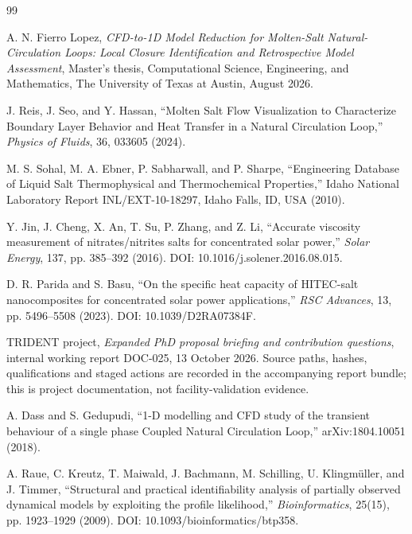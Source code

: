\begin{thebibliography}{99}

A. N. Fierro Lopez, \emph{CFD-to-1D Model Reduction for Molten-Salt Natural-Circulation Loops: Local Closure Identification and Retrospective Model Assessment},
Master's thesis, Computational Science, Engineering, and Mathematics,
The University of Texas at Austin, August 2026.

J. Reis, J. Seo, and Y. Hassan, ``Molten Salt Flow Visualization to Characterize Boundary Layer Behavior and Heat Transfer in a Natural Circulation Loop,'' \emph{Physics of Fluids}, 36, 033605 (2024).

M. S. Sohal, M. A. Ebner, P. Sabharwall, and P. Sharpe, ``Engineering Database of Liquid Salt Thermophysical and Thermochemical Properties,'' Idaho National Laboratory Report INL/EXT-10-18297, Idaho Falls, ID, USA (2010).

Y. Jin, J. Cheng, X. An, T. Su, P. Zhang, and Z. Li, ``Accurate viscosity measurement of nitrates/nitrites salts for concentrated solar power,'' \emph{Solar Energy}, 137, pp. 385--392 (2016). DOI: 10.1016/j.solener.2016.08.015.

D. R. Parida and S. Basu, ``On the specific heat capacity of HITEC-salt nanocomposites for concentrated solar power applications,'' \emph{RSC Advances}, 13, pp. 5496--5508 (2023). DOI: 10.1039/D2RA07384F.

TRIDENT project, \emph{Expanded PhD proposal briefing and contribution questions}, internal working report DOC-025, 13 October 2026. Source paths, hashes, qualifications and staged actions are recorded in the accompanying report bundle; this is project documentation, not facility-validation evidence.

A. Dass and S. Gedupudi, ``1-D modelling and CFD study of the transient behaviour of a single phase Coupled Natural Circulation Loop,'' arXiv:1804.10051 (2018).

A. Raue, C. Kreutz, T. Maiwald, J. Bachmann, M. Schilling, U. Klingm\"uller, and J. Timmer, ``Structural and practical identifiability analysis of partially observed dynamical models by exploiting the profile likelihood,'' \emph{Bioinformatics}, 25(15), pp. 1923--1929 (2009). DOI: 10.1093/bioinformatics/btp358.



\end{thebibliography}

